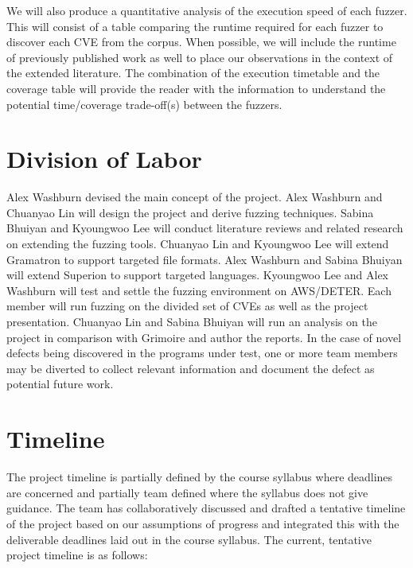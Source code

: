 \documentclass[12pt]{diazessay}
\begin{document}
We will also produce a quantitative analysis of the execution speed of each fuzzer.
This will consist of a table comparing the runtime required for each fuzzer to discover each CVE from the corpus.
When possible, we will include the runtime of previously published work as well to place our observations in the context of the extended literature.
The combination of the execution timetable and the coverage table will provide the reader with the information to understand the potential time/coverage trade-off(s) between the fuzzers.

\section*{Division of Labor}

Alex Washburn devised the main concept of the project.
Alex Washburn and Chuanyao Lin will design the project and derive fuzzing techniques.
Sabina Bhuiyan and Kyoungwoo Lee will conduct literature reviews and related research on extending the fuzzing tools.
Chuanyao Lin and Kyoungwoo Lee will extend Gramatron to support targeted file formats.
Alex Washburn and Sabina Bhuiyan will extend Superion to support targeted languages.
Kyoungwoo Lee and Alex Washburn will test and settle the fuzzing environment on AWS/DETER.
Each member will run fuzzing on the divided set of CVEs as well as the project presentation.
Chuanyao Lin and Sabina Bhuiyan will run an analysis on the project in comparison with Grimoire and author the reports.
In the case of novel defects being discovered in the programs under test, one or more team members may be diverted to collect relevant information and document the defect as potential future work.

\clearpage
\section*{Timeline}

The project timeline is partially defined by the course syllabus where deadlines are concerned and partially team defined where the syllabus does not give guidance.
The team has collaboratively discussed and drafted a tentative timeline of the project based on our assumptions of progress and integrated this with the deliverable deadlines laid out in the course syllabus. The current, tentative project timeline is as follows:
\end{document}
